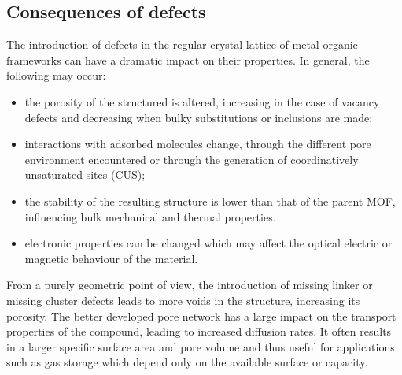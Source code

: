 
\subsection{Consequences of defects}

The introduction of defects in the regular crystal lattice of metal
organic frameworks can have a dramatic impact on their properties.
In general, the following may occur:

\begin{itemize}
    \item the porosity of the structured is altered, increasing 
    in the case of vacancy defects and decreasing when bulky 
    substitutions or inclusions are made;
    \item interactions with adsorbed molecules change,
    through the different pore environment encountered or 
    through the generation of coordinatively unsaturated 
    sites (CUS);
    \item the stability of the resulting structure is lower
    than that of the parent MOF, influencing bulk mechanical
    and thermal properties.
    \item electronic properties can be changed which may 
    affect the optical electric or magnetic behaviour of the 
    material.
\end{itemize}

From a purely geometric point of view, the introduction of missing
linker or missing cluster defects leads to more voids in the structure,
increasing its porosity. The better developed pore network has 
a large impact on the transport properties of the compound, leading 
to increased diffusion rates. It often results in a larger 
specific surface area and pore volume and thus useful for applications
such as gas storage which depend only on the available surface or
capacity.


